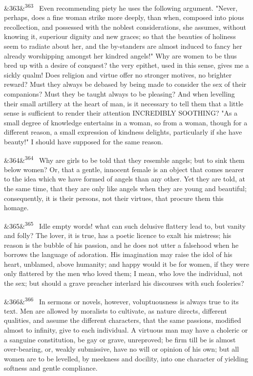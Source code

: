 \documentclass[12pt]{article}
\newcommand{\para}[1][]{\par\noindent\ifx&#1&\else\textsuperscript{\footnotesize #1}~\fi}
\begin{document}
\para[363] Even recommending piety he uses the following argument. "Never, perhaps, does a fine woman strike more deeply, than when, composed into pious recollection, and possessed with the noblest considerations, she assumes, without knowing it, superiour dignity and new graces; so that the beauties of holiness seem to radiate about her, and the by-standers are almost induced to fancy her already worshipping amongst her kindred angels!" Why are women to be thus bred up with a desire of conquest? the very epithet, used in this sense, gives me a sickly qualm! Does religion and virtue offer no stronger motives, no brighter reward? Must they always be debased by being made to consider the sex of their companions? Must they be taught always to be pleasing? And when levelling their small artillery at the heart of man, is it necessary to tell them that a little sense is sufficient to render their attention INCREDIBLY SOOTHING? "As a small degree of knowledge entertains in a woman, so from a woman, though for a different reason, a small expression of kindness delights, particularly if she have beauty!" I should have supposed for the same reason.

\para[364] Why are girls to be told that they resemble angels; but to sink them below women? Or, that a gentle, innocent female is an object that comes nearer to the idea which we have formed of angels than any other. Yet they are told, at the same time, that they are only like angels when they are young and beautiful; consequently, it is their persons, not their virtues, that procure them this homage.

\para[365] Idle empty words! what can such delusive flattery lead to, but vanity and folly? The lover, it is true, has a poetic licence to exalt his mistress; his reason is the bubble of his passion, and he does not utter a falsehood when he borrows the language of adoration. His imagination may raise the idol of his heart, unblamed, above humanity; and happy would it be for women, if they were only flattered by the men who loved them; I mean, who love the individual, not the sex; but should a grave preacher interlard his discourses with such fooleries?

\para[366] In sermons or novels, however, voluptuousness is always true to its text. Men are allowed by moralists to cultivate, as nature directs, different qualities, and assume the different characters, that the same passions, modified almost to infinity, give to each individual. A virtuous man may have a choleric or a sanguine constitution, be gay or grave, unreproved; be firm till be is almost over-bearing, or, weakly submissive, have no will or opinion of his own; but all women are to be levelled, by meekness and docility, into one character of yielding softness and gentle compliance.
\end{document}
